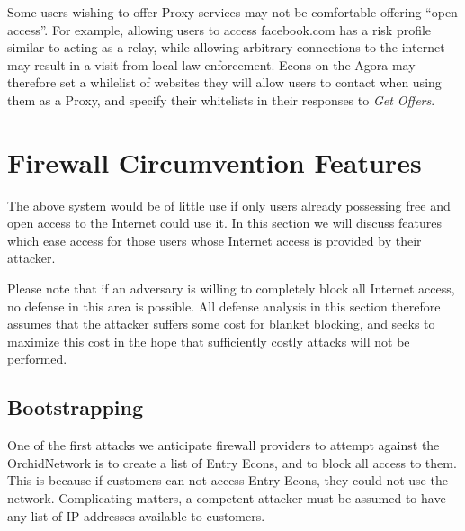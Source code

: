 \documentclass{article}
\newcommand{\orchid}{Orchid}
\newcommand{\Orchid}{\orchid}
\begin{document}
Some users wishing to offer Proxy services may not be comfortable offering ``open access''. For example, allowing users to access facebook.com has a risk profile similar to acting as a relay, while allowing arbitrary connections to the internet may result in a visit from local law enforcement. Econs on the Agora may therefore set a whilelist of websites they will allow users to contact when using them as a Proxy, and specify their whitelists in their responses to \emph{Get Offers}.


\section{Firewall Circumvention Features}
\label{sec:evasion}

The above system would be of little use if only users already
possessing free and open access to the Internet could use it. In this
section we will discuss features which ease access for those users
whose Internet access is provided by their attacker.

Please note that if an adversary is willing to completely block all
Internet access, no defense in this area is possible. All defense
analysis in this section therefore assumes that the attacker suffers
some cost for blanket blocking, and seeks to maximize this cost in the
hope that sufficiently costly attacks will not be performed.

\subsection{Bootstrapping}

One of the first attacks we anticipate firewall providers to attempt
against the \Orchid Network is to create a list of Entry Econs, and to
block all access to them. This is because if customers can not access
Entry Econs, they could not use the network. Complicating matters, a
competent attacker must be assumed to have any list of IP addresses
available to customers.

\end{document}
